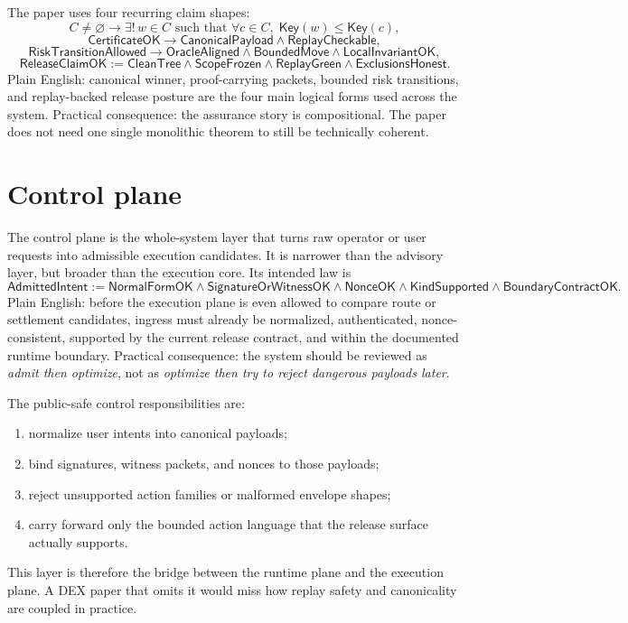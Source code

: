 \documentclass[10pt]{extarticle}
\newcommand{\Key}{\mathsf{Key}}
\begin{document}
The paper uses four recurring claim shapes:
\[
C \neq \varnothing \to \exists !\, w \in C \text{ such that } \forall c \in C,\; \Key(w) \le \Key(c),
\]
\[
\mathsf{CertificateOK} \to \mathsf{CanonicalPayload} \wedge \mathsf{ReplayCheckable},
\]
\[
\mathsf{RiskTransitionAllowed} \to \mathsf{OracleAligned} \wedge \mathsf{BoundedMove} \wedge \mathsf{LocalInvariantOK},
\]
\[
\mathsf{ReleaseClaimOK} := \mathsf{CleanTree} \wedge \mathsf{ScopeFrozen} \wedge \mathsf{ReplayGreen} \wedge \mathsf{ExclusionsHonest}.
\]
Plain English: canonical winner, proof-carrying packets, bounded risk
transitions, and replay-backed release posture are the four main logical forms
used across the system.
Practical consequence: the assurance story is compositional. The paper does not
need one single monolithic theorem to still be technically coherent.

\section{Control plane}
The control plane is the whole-system layer that turns raw operator or user
requests into admissible execution candidates. It is narrower than the advisory
layer, but broader than the execution core.
Its intended law is
\[
\mathsf{AdmittedIntent}
:= \mathsf{NormalFormOK}
\wedge \mathsf{SignatureOrWitnessOK}
\wedge \mathsf{NonceOK}
\wedge \mathsf{KindSupported}
\wedge \mathsf{BoundaryContractOK}.
\]
Plain English: before the execution plane is even allowed to compare route
or settlement candidates, ingress must already be normalized, authenticated,
nonce-consistent, supported by the current release contract, and within the
documented runtime boundary.
Practical consequence: the system should be reviewed as
\emph{admit then optimize}, not as \emph{optimize then try to reject dangerous
payloads later}.

The public-safe control responsibilities are:
\begin{enumerate}
  \item normalize user intents into canonical payloads;
  \item bind signatures, witness packets, and nonces to those payloads;
  \item reject unsupported action families or malformed envelope shapes;
  \item carry forward only the bounded action language that the release surface
  actually supports.
\end{enumerate}

This layer is therefore the bridge between the runtime plane and the execution
plane. A DEX paper that omits it would miss how replay safety and canonicality
are coupled in practice.
\end{document}

